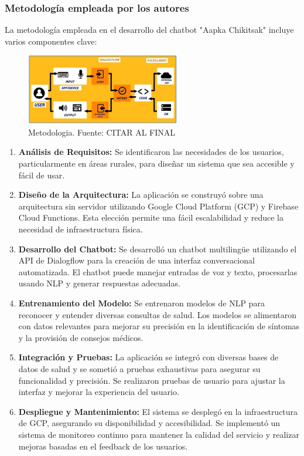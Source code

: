 \subsubsection{Metodología empleada por los autores}
	La metodología empleada en el desarrollo del chatbot "Aapka Chikitsak" incluye varios componentes clave:
	\begin{figure}[h]
		\begin{center}
			\includegraphics[width=0.6\textwidth]{2/1_antecedentes/Metodologia1- 3.png}
			\caption{Metodologia. Fuente: CITAR AL FINAL }
		\end{center}
	\end{figure}
	\begin{enumerate}
		
		\item \textbf{Análisis de Requisitos:} Se identificaron las necesidades de los usuarios, particularmente en áreas rurales, para diseñar un sistema que sea accesible y fácil de usar.
		
		\item \textbf{Diseño de la Arquitectura:} La aplicación se construyó sobre una arquitectura sin servidor utilizando Google Cloud Platform (GCP) y Firebase Cloud Functions. Esta elección permite una fácil escalabilidad y reduce la necesidad de infraestructura física.
		
		\item \textbf{Desarrollo del Chatbot:} Se desarrolló un chatbot multilingüe utilizando el API de Dialogflow para la creación de una interfaz conversacional automatizada. El chatbot puede manejar entradas de voz y texto, procesarlas usando NLP y generar respuestas adecuadas.
		
		\item \textbf{Entrenamiento del Modelo:} Se entrenaron modelos de NLP para reconocer y entender diversas consultas de salud. Los modelos se alimentaron con datos relevantes para mejorar su precisión en la identificación de síntomas y la provisión de consejos médicos.
		
		\item \textbf{Integración y Pruebas:} La aplicación se integró con diversas bases de datos de salud y se sometió a pruebas exhaustivas para asegurar su funcionalidad y precisión. Se realizaron pruebas de usuario para ajustar la interfaz y mejorar la experiencia del usuario.
		
		\item \textbf{Despliegue y Mantenimiento:} El sistema se desplegó en la infraestructura de GCP, asegurando su disponibilidad y accesibilidad. Se implementó un sistema de monitoreo continuo para mantener la calidad del servicio y realizar mejoras basadas en el feedback de los usuarios.
	\end{enumerate}

